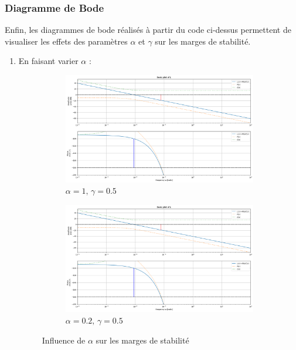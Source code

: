 \subsubsection{Diagramme de Bode}
Enfin, les diagrammes de bode réalisés à partir du code ci-dessus permettent de visualiser les effets des paramètres $\alpha$ et $\gamma$ sur les marges de stabilité.
\begin{enumerate}
    \item En faisant varier $\alpha$ : 
    \begin{figure}[H]
        \centering
        \begin{subfigure}[b]{0.48\textwidth}
            \includegraphics[width=\textwidth]{figures/marginsalpha1.png}
            \caption{$\alpha=1,\, \gamma = 0.5$}
        \end{subfigure}
        \begin{subfigure}[b]{0.48\textwidth}
            \includegraphics[width=\textwidth]{figures/marginsalpha02.png}
            \caption{$\alpha = 0.2,\, \gamma = 0.5$}
        \end{subfigure}
        \caption{Influence de $\alpha$ sur les marges de stabilité}

\end{figure}
\end{enumerate}
